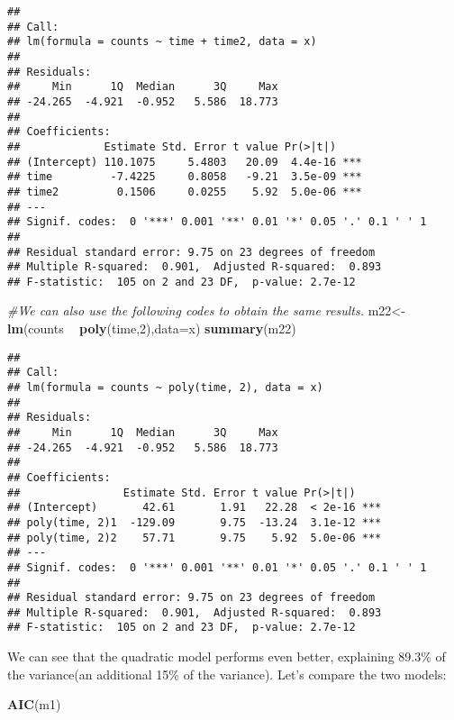 \documentclass[]{book}
\newenvironment{Shaded}{\begin{snugshade}}{\end{snugshade}}
\newcommand{\KeywordTok}[1]{\textcolor[rgb]{0.13,0.29,0.53}{\textbf{#1}}}
\newcommand{\DataTypeTok}[1]{\textcolor[rgb]{0.13,0.29,0.53}{#1}}
\newcommand{\DecValTok}[1]{\textcolor[rgb]{0.00,0.00,0.81}{#1}}
\newcommand{\StringTok}[1]{\textcolor[rgb]{0.31,0.60,0.02}{#1}}
\newcommand{\CommentTok}[1]{\textcolor[rgb]{0.56,0.35,0.01}{\textit{#1}}}
\newcommand{\OperatorTok}[1]{\textcolor[rgb]{0.81,0.36,0.00}{\textbf{#1}}}
\newcommand{\NormalTok}[1]{#1}
\theoremstyle{definition}
\theoremstyle{definition}
\theoremstyle{definition}
\theoremstyle{remark}
\begin{document}
\begin{verbatim}
## 
## Call:
## lm(formula = counts ~ time + time2, data = x)
## 
## Residuals:
##     Min      1Q  Median      3Q     Max 
## -24.265  -4.921  -0.952   5.586  18.773 
## 
## Coefficients:
##             Estimate Std. Error t value Pr(>|t|)    
## (Intercept) 110.1075     5.4803   20.09  4.4e-16 ***
## time         -7.4225     0.8058   -9.21  3.5e-09 ***
## time2         0.1506     0.0255    5.92  5.0e-06 ***
## ---
## Signif. codes:  0 '***' 0.001 '**' 0.01 '*' 0.05 '.' 0.1 ' ' 1
## 
## Residual standard error: 9.75 on 23 degrees of freedom
## Multiple R-squared:  0.901,  Adjusted R-squared:  0.893 
## F-statistic:  105 on 2 and 23 DF,  p-value: 2.7e-12
\end{verbatim}

\begin{Shaded}
\begin{Highlighting}[]
\CommentTok{#We can also use the following codes to obtain the same results.}
\NormalTok{m22<-}\KeywordTok{lm}\NormalTok{(counts }\OperatorTok{~}\StringTok{ }\KeywordTok{poly}\NormalTok{(time,}\DecValTok{2}\NormalTok{),}\DataTypeTok{data=}\NormalTok{x)}
\KeywordTok{summary}\NormalTok{(m22)}
\end{Highlighting}
\end{Shaded}

\begin{verbatim}
## 
## Call:
## lm(formula = counts ~ poly(time, 2), data = x)
## 
## Residuals:
##     Min      1Q  Median      3Q     Max 
## -24.265  -4.921  -0.952   5.586  18.773 
## 
## Coefficients:
##                Estimate Std. Error t value Pr(>|t|)    
## (Intercept)       42.61       1.91   22.28  < 2e-16 ***
## poly(time, 2)1  -129.09       9.75  -13.24  3.1e-12 ***
## poly(time, 2)2    57.71       9.75    5.92  5.0e-06 ***
## ---
## Signif. codes:  0 '***' 0.001 '**' 0.01 '*' 0.05 '.' 0.1 ' ' 1
## 
## Residual standard error: 9.75 on 23 degrees of freedom
## Multiple R-squared:  0.901,  Adjusted R-squared:  0.893 
## F-statistic:  105 on 2 and 23 DF,  p-value: 2.7e-12
\end{verbatim}

We can see that the quadratic model performs even better, explaining
89.3\% of the variance(an additional 15\% of the variance). Let's
compare the two models:

\begin{Shaded}
\begin{Highlighting}[]
\KeywordTok{AIC}\NormalTok{(m1)}
\end{Highlighting}
\end{Shaded}
\end{document}
